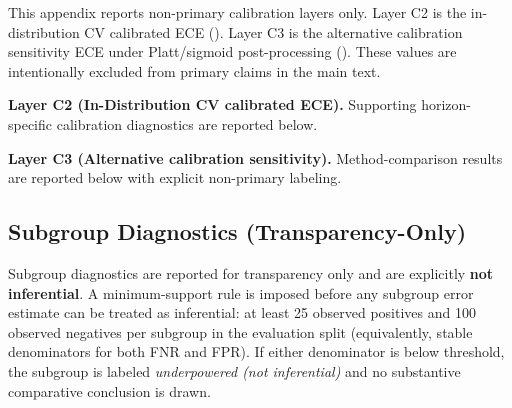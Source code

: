 \documentclass[11pt, letterpaper]{article}
\begin{document}
\noindent This appendix reports non-primary calibration layers only. Layer C2 is the in-distribution CV calibrated ECE (\metricECEInDistCVCalibrated{}). Layer C3 is the alternative calibration sensitivity ECE under Platt/sigmoid post-processing (\metricECEAltCalibrationSensitivity{}). These values are intentionally excluded from primary claims in the main text.

\vspace{1em}
\noindent \textbf{Layer C2 (In-Distribution CV calibrated ECE).} Supporting horizon-specific calibration diagnostics are reported below.


\vspace{1em}
\noindent \textbf{Layer C3 (Alternative calibration sensitivity).} Method-comparison results are reported below with explicit non-primary labeling.


\newpage
\subsection{Subgroup Diagnostics (Transparency-Only)}
\label{app:subgroup_diagnostics}

\noindent Subgroup diagnostics are reported for transparency only and are explicitly \textbf{not inferential}. A minimum-support rule is imposed before any subgroup error estimate can be treated as inferential: at least 25 observed positives and 100 observed negatives per subgroup in the evaluation split (equivalently, stable denominators for both FNR and FPR). If either denominator is below threshold, the subgroup is labeled \textit{underpowered (not inferential)} and no substantive comparative conclusion is drawn.

\begin{table}[H]
\centering
\caption{Subgroup Error Diagnostics (Transparency-Only; Not Inferential)}
\label{tab:subgroup_transparency}
\renewcommand{\arraystretch}{1.2}
\end{table}
\end{document}
